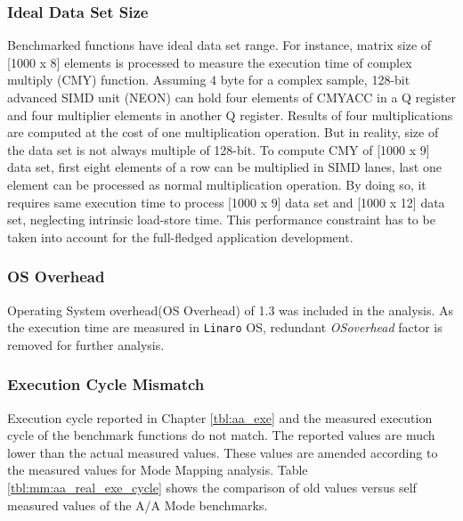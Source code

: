 \subsubsection{Ideal Data Set Size}
Benchmarked functions have ideal data set range. For instance, matrix size of [1000 x 8] elements is processed to measure the execution time of complex multiply (CMY) function. Assuming 4 byte for a complex sample, 128-bit advanced SIMD unit (NEON) can hold four elements of CMYACC in a Q register and four multiplier elements in another Q register. Results of four multiplications are computed at the cost of one multiplication operation. But in reality, size of the data set is not always multiple of 128-bit. To compute CMY of [1000 x 9] data set, first eight elements of a row can be multiplied in SIMD lanes, last one element can be processed as normal multiplication operation. By doing so, it requires same execution time to process [1000 x 9] data set and [1000 x 12] data set, neglecting intrinsic load-store time. This performance constraint has to be taken into account for the full-fledged application development.

\subsubsection{OS Overhead}
Operating System overhead(OS Overhead) of 1.3 was included in the analysis. As the execution time are measured in \verb|Linaro| OS, redundant \textsl{OSoverhead} factor is removed for further analysis.

\subsubsection{Execution Cycle Mismatch}
\label{mm:cons:exe_cyl_mismatch}
Execution cycle reported in Chapter \ref{tbl:aa_exe} and the measured execution cycle of the benchmark functions do not match. The reported values are much lower than the actual measured values. These values are amended according to the measured values for Mode Mapping analysis. Table \ref{tbl:mm:aa_real_exe_cycle} shows the comparison of old values versus self measured values of the A/A Mode benchmarks.

